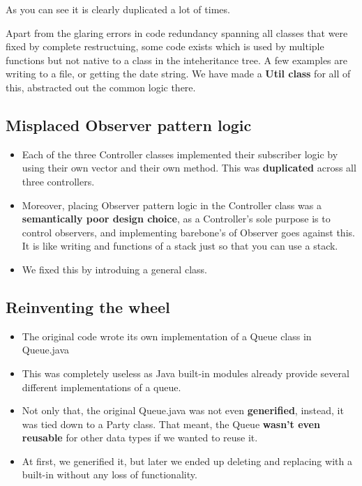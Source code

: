 As you can see it is clearly duplicated a lot of times.

Apart from the glaring errors in code redundancy spanning all classes that were fixed by complete restructuing, some code exists which is used by multiple functions but not native to a class in the inteheritance tree. A few examples are writing to a file, or getting the date string. We have made a \textbf{Util class} for all of this, abstracted out the common logic there.

\subsection{Misplaced Observer pattern logic}

\begin{itemize}

	\item Each of the three Controller classes implemented their subscriber logic by using their own  vector and their own  method. This was \textbf{duplicated} across all three controllers.
	\item Moreover, placing Observer pattern logic in the Controller class was a \textbf{semantically poor design choice}, as a Controller's sole purpose is to control observers, and implementing barebone's of Observer goes against this. It is like writing  and  functions of a stack just so that you can use a stack.
	\item We fixed this by introduing a general  class.

\end{itemize}

\subsection{Reinventing the wheel}

\begin{itemize}
	\item The original code wrote its own implementation of a Queue class in Queue.java
	\item This was completely useless as Java built-in modules already provide several different implementations of a queue.
	\item Not only that, the original Queue.java was not even \textbf{generified}, instead, it was tied down to a Party class. That meant, the Queue \textbf{wasn't even reusable} for other data types if we wanted to reuse it.
	\item At first, we generified it, but later we ended up deleting and replacing with a built-in  without any loss of functionality.
\end{itemize}


